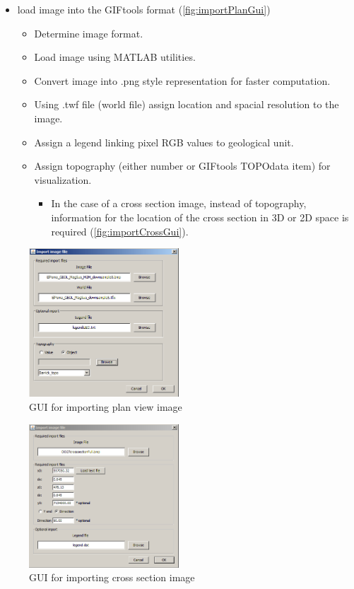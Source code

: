 \begin{itemize}
\item load image into the GIFtools format (\autoref{fig:importPlanGui})
\begin{itemize}
	\item Determine image format.
	\item Load image using MATLAB utilities.
	\item Convert image into .png style representation for faster computation.
	\item Using .twf file (world file) assign location and spacial resolution to the image.
	\item Assign a legend linking pixel RGB values to geological unit.
	\item Assign topography (either number or GIFtools TOPOdata item) for visualization.
	\begin{itemize}
		\item In the case of a cross section image, instead of topography, information for the location of the cross section in 3D or 2D space is required (\autoref{fig:importCrossGui}).
	\end{itemize}
\end{itemize}
\end{itemize}
\begin{figure} [h]
    \centering
    \includegraphics[width=0.5\textwidth]{images/MaptoModel/importPlan.PNG}
    \caption{\ac{GUI} for importing plan view image }
    \label{fig:importPlanGui}
\end{figure}
\begin{figure} [h]
    \centering
    \includegraphics[width=0.5\textwidth]{images/MaptoModel/importCross.PNG}
    \caption{\ac{GUI} for importing cross section image }
    \label{fig:importCrossGui}
\end{figure}
